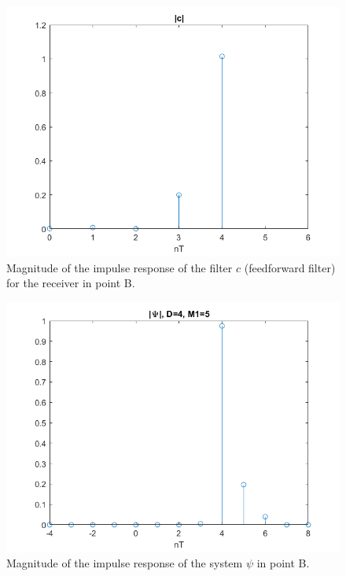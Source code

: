 \documentclass[a4paper,11.5pt]{article}
\begin{document}
\begin{figure}[ht]
	\begin{center}   
		\includegraphics[width=\textwidth]{figs/B_c.png} 
		\caption{Magnitude of the impulse response of the filter $c$ (feedforward filter) for the receiver in point B.}
		\label{fig:B_c}
	\end{center}
\end{figure}

\begin{figure}[ht]
	\begin{center}   
		\includegraphics[width=\textwidth]{figs/B_psi.png} 
		\caption{Magnitude of the impulse response of the system $\psi$ in point B.}
		\label{fig:B_psi}
	\end{center}
\end{figure}
\end{document}
